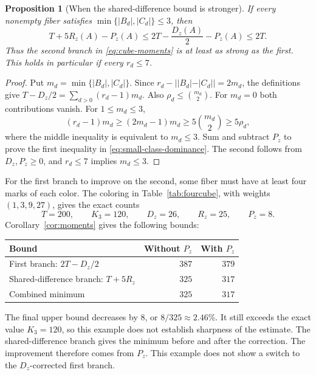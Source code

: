 \documentclass[11pt,a4paper]{article}
\newif\ifshowrevisions
\newenvironment{revision}{\par\begingroup\ifshowrevisions\color{red}\fi}{\par\endgroup}
\newtheorem{proposition}[theorem]{Proposition}
\theoremstyle{definition}
\numberwithin{equation}{section}
\begin{document}
\begin{proposition}[When the shared-difference bound is stronger]
\label{prop:small-class-deficit-dominance}
If every nonempty fiber satisfies $\min\{|B_d|,|C_d|\}\le3$, then
\begin{equation}\label{eq:small-class-dominance}
T+5R_z(A)-P_z(A)\le2T-\frac{D_z(A)}2-P_z(A)\le2T.
\end{equation}
Thus the second branch in \eqref{eq:cube-moments} is at least as strong
as the first. This holds in particular if every $r_d\le7$.
\end{proposition}
\begin{proof}
Put $m_d=\min\{|B_d|,|C_d|\}$. Since
$r_d-||B_d|-|C_d||=2m_d$, the definitions give
$T-D_z/2=\sum_{d>0}(r_d-1)m_d$.
Also $\rho_d\le\binom{m_d}{2}$.
For $m_d=0$ both contributions vanish. For $1\le m_d\le3$,
\[
(r_d-1)m_d\ge(2m_d-1)m_d
\ge5\binom{m_d}{2}\ge5\rho_d,
\]
where the middle inequality is equivalent to $m_d\le3$.
Sum and subtract $P_z$ to prove the first inequality in
\eqref{eq:small-class-dominance}. The second follows from $D_z,P_z\ge0$,
and $r_d\le7$ implies $m_d\le3$.
\end{proof}

\begin{revision}
For the first branch to improve on the second, some fiber must have at
least four marks of each color. The coloring in Table~\ref{tab:fourcube},
with weights $(1,3,9,27)$, gives the exact counts
\begin{equation}\label{eq:fourcube-moment-comparison}
T=200,\qquad K_3=120,\qquad D_z=26,\qquad R_z=25,\qquad P_z=8.
\end{equation}
Corollary~\ref{cor:moments} gives the following bounds:
\begin{center}
\begin{tabular}{@{}lrr@{}}
\toprule
Bound & Without $P_z$ & With $P_z$\\\midrule
First branch: $2T-D_z/2$ & $387$ & $379$\\
Shared-difference branch: $T+5R_z$ & $325$ & $317$\\
Combined minimum & $325$ & $317$\\
\bottomrule
\end{tabular}
\end{center}
The final upper bound decreases by $8$, or
$8/325\approx2.46\%$. It still exceeds the exact value $K_3=120$,
so this example does not establish sharpness of the estimate.
The shared-difference branch gives the minimum before and after the
correction. The improvement therefore comes from $P_z$. This example does
not show a switch to the $D_z$-corrected first branch.
\end{revision}
\end{document}
